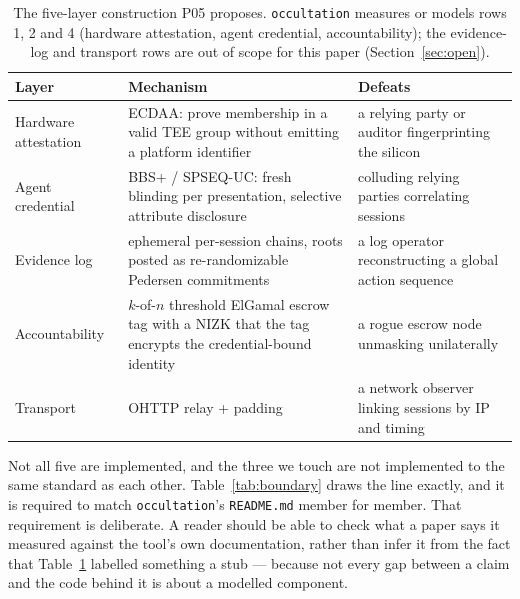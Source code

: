 \documentclass[11pt]{article}
\newcommand{\occultation}{\texttt{occultation}}
\begin{document}
\begin{table}[h]
\centering\small
\caption{The five-layer construction P05 proposes. \occultation{} measures
or models rows 1, 2 and 4 (hardware attestation, agent credential,
accountability); the evidence-log and transport rows are out of scope for
this paper (Section~\ref{sec:open}).}
\label{tab:layers}
\begin{tabular}{@{}p{2.6cm}p{5.0cm}p{5.4cm}@{}}
\toprule
\textbf{Layer} & \textbf{Mechanism} & \textbf{Defeats} \\
\midrule
Hardware attestation & ECDAA: prove membership in a valid TEE group without
emitting a platform identifier & a relying party or auditor fingerprinting
the silicon \\
\addlinespace
Agent credential & BBS+ / SPSEQ-UC: fresh blinding per presentation,
selective attribute disclosure & colluding relying parties correlating
sessions \\
\addlinespace
Evidence log & ephemeral per-session chains, roots posted as
re-randomizable Pedersen commitments & a log operator reconstructing a
global action sequence \\
\addlinespace
Accountability & $k$-of-$n$ threshold ElGamal escrow tag with a NIZK that the
tag encrypts the credential-bound identity & a rogue escrow node unmasking
unilaterally \\
\addlinespace
Transport & OHTTP relay + padding & a network observer linking sessions by
IP and timing \\
\bottomrule
\end{tabular}
\end{table}

Not all five are implemented, and the three we touch are not implemented to
the same standard as each other. Table~\ref{tab:boundary} draws the line
exactly, and it is required to match \occultation{}'s \texttt{README.md}
member for member. That requirement is deliberate. A reader should be able to
check what a paper says it measured against the tool's own documentation,
rather than infer it from the fact that Table~\ref{tab:layers} labelled
something a stub --- because not every gap between a claim and the code
behind it is about a modelled component.
\end{document}
